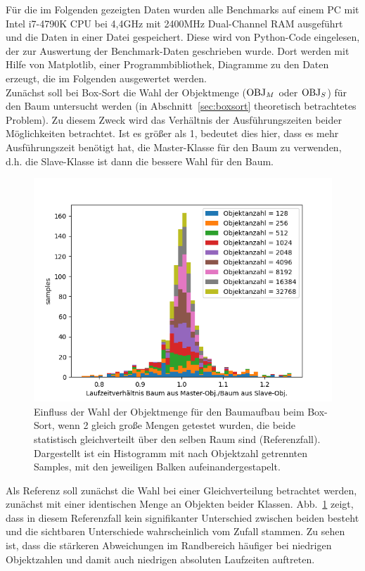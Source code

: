 Für die im Folgenden gezeigten Daten wurden alle Benchmarks auf einem PC mit Intel i7-4790K CPU bei 4,4GHz mit 2400MHz Dual-Channel RAM ausgeführt und die Daten in einer Datei gespeichert. Diese wird von Python-Code eingelesen, der zur Auswertung der Benchmark-Daten geschrieben wurde. Dort werden mit Hilfe von Matplotlib, einer Programmbibliothek, Diagramme zu den Daten erzeugt, die im Folgenden ausgewertet werden.\\


Zunächst soll bei Box-Sort die Wahl der Objektmenge ($\operatorname{OBJ}_M$ oder $\operatorname{OBJ}_S$) für den Baum untersucht werden (in Abschnitt~\ref{sec:boxsort} theoretisch betrachtetes Problem). Zu diesem Zweck wird das Verhältnis der Ausführungszeiten beider Möglichkeiten betrachtet. Ist es größer als 1, bedeutet dies hier, dass es mehr Ausführungszeit benötigt hat, die Master-Klasse für den Baum zu verwenden, d.h. die Slave-Klasse ist dann die bessere Wahl für den Baum.\\
\begin{figure}
    \centering
    \includegraphics[width=1.0\textwidth]{./res/boxsortChoice-reference.png}
    \caption{Einfluss der Wahl der Objektmenge für den Baumaufbau beim Box-Sort, wenn 2 gleich große Mengen getestet wurden, die beide statistisch gleichverteilt über den selben Raum sind (Referenzfall).  Dargestellt ist ein Histogramm mit nach Objektzahl getrennten Samples, mit den jeweiligen Balken aufeinandergestapelt.}
    \label{fig:boxsortCoice-reference}
\end{figure}
Als Referenz soll zunächst die Wahl bei einer Gleichverteilung betrachtet werden, zunächst mit einer identischen Menge an Objekten beider Klassen. Abb.~\ref{fig:boxsortCoice-reference} zeigt, dass in diesem Referenzfall kein signifikanter Unterschied zwischen beiden besteht und die sichtbaren Unterschiede wahrscheinlich vom Zufall stammen. Zu sehen ist, dass die stärkeren Abweichungen im Randbereich häufiger bei niedrigen Objektzahlen und damit auch niedrigen absoluten Laufzeiten auftreten.\\


